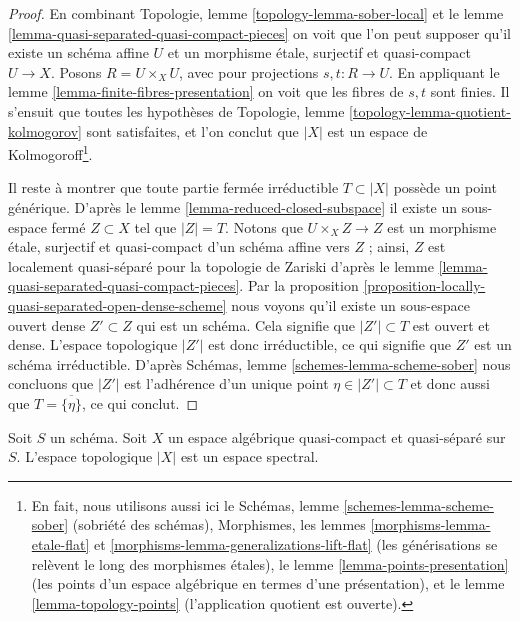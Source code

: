 \begin{proof}
En combinant
Topologie, lemme \ref{topology-lemma-sober-local}
et le
lemme \ref{lemma-quasi-separated-quasi-compact-pieces}
on voit que l'on peut supposer qu'il existe un schéma affine $U$
et un morphisme \'etale, surjectif et quasi-compact $U \to X$.
Posons $R = U \times_X U$, avec pour projections $s, t : R \to U$. En appliquant le
lemme \ref{lemma-finite-fibres-presentation}
on voit que les fibres de $s, t$ sont finies. Il s'ensuit que toutes les hypothèses de
Topologie, lemme \ref{topology-lemma-quotient-kolmogorov}
sont satisfaites, et l'on conclut que $|X|$ est un espace de Kolmogoroff\footnote{
En fait, nous utilisons aussi ici le
Schémas, lemme \ref{schemes-lemma-scheme-sober} (sobriété des schémas),
Morphismes, les lemmes \ref{morphisms-lemma-etale-flat}
et \ref{morphisms-lemma-generalizations-lift-flat} (les générisations
se relèvent le long des morphismes \'etales), le
lemme \ref{lemma-points-presentation} (les points d'un espace algébrique en
termes d'une présentation), et le
lemme \ref{lemma-topology-points} (l'application quotient est ouverte).}.

\medskip\noindent
Il reste à montrer que toute partie fermée irréductible
$T \subset |X|$ possède un point générique. D'après le
lemme \ref{lemma-reduced-closed-subspace}
il existe un sous-espace fermé $Z \subset X$ tel que $|Z| = T$.
Notons que $U \times_X Z \to Z$ est un morphisme \'etale, surjectif et
quasi-compact d'un schéma affine vers $Z$ ; ainsi, $Z$ est localement
quasi-séparé pour la topologie de Zariski d'après le
lemme \ref{lemma-quasi-separated-quasi-compact-pieces}.
Par la
proposition \ref{proposition-locally-quasi-separated-open-dense-scheme}
nous voyons qu'il existe un sous-espace ouvert dense $Z' \subset Z$
qui est un schéma. Cela signifie que $|Z'| \subset T$ est ouvert et dense.
L'espace topologique $|Z'|$ est donc irréductible, ce qui signifie que
$Z'$ est un schéma irréductible. D'après
Schémas, lemme \ref{schemes-lemma-scheme-sober}
nous concluons que $|Z'|$ est l'adhérence d'un unique point
$\eta \in |Z'| \subset T$ et donc aussi que $T = \overline{\{\eta\}}$, ce qui conclut.
\end{proof}

\begin{lemma}
\label{lemma-quasi-compact-quasi-separated-spectral}
Soit $S$ un schéma. Soit $X$ un espace algébrique quasi-compact et
quasi-séparé sur $S$. L'espace topologique $|X|$ est un espace spectral.
\end{lemma}

